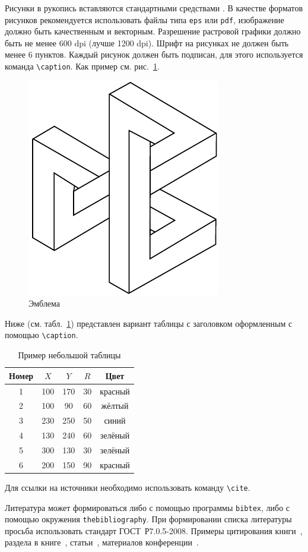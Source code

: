 \documentclass[60x84/16,8pt]{ittmm}
\begin{document}
Рисунки в рукопись вставляются стандартными средствами \LaTeXe.  В
качестве форматов рисунков рекомендуется использовать файлы типа
\texttt{eps} или \texttt{pdf}, изображение должно быть качественным и
векторным. Разрешение растровой графики должно быть не менее 600 dpi
(лучше 1200 dpi). Шрифт на рисунках не должен быть менее 6 пунктов.
Каждый рисунок должен быть подписан, для этого
используется команда \verb"\caption". 
Как пример см. рис.~\ref{fig:logo}.

\begin{figure}
  \centering
  \includegraphics[width=0.2\linewidth]{embl}
  \caption{Эмблема}
  \label{fig:logo}
\end{figure}

Ниже (см. табл.~\ref{tab:sampletable}) представлен вариант таблицы с
заголовком оформленным с помощью \verb"\caption".

\begin{table}
  \centering
  \caption{Пример небольшой таблицы}
  \label{tab:sampletable}
  \begin{tabular}{|c|c|c|c|c|}
    \hline
    Номер & $X$ & $Y$ & $R$ & Цвет\\
    \hline
    1 &     100  &  170 & 30 & красный\\
    2 &     100  &  90      & 60 & жёлтый\\
    3 &     230  &  250     & 50 & синий\\
    4 &     130  &  240 & 60 & зелёный\\
    5 & 300  &      130 & 30 & зелёный\\
    6 &     200  &  150     & 90 & красный\\
    \hline
  \end{tabular}
\end{table}

Для ссылки на источники необходимо использовать команду \verb"\cite".

Литература может формироваться либо с помощью программы \verb"bibtex",
либо с помощью окружения \verb"thebibliography".
При формировании списка литературы просьба использовать стандарт
ГОСТ~Р7.0.5-2008. Примеры цитирования книги~\cite{mathtensor,
  jones-fogelin:tcqd}, раздела в книге~\cite{Muller2006},
статьи~\cite{Arduengo1991, Booth1962},
материалов конференции~\cite{Hope2005}.
\end{document}
